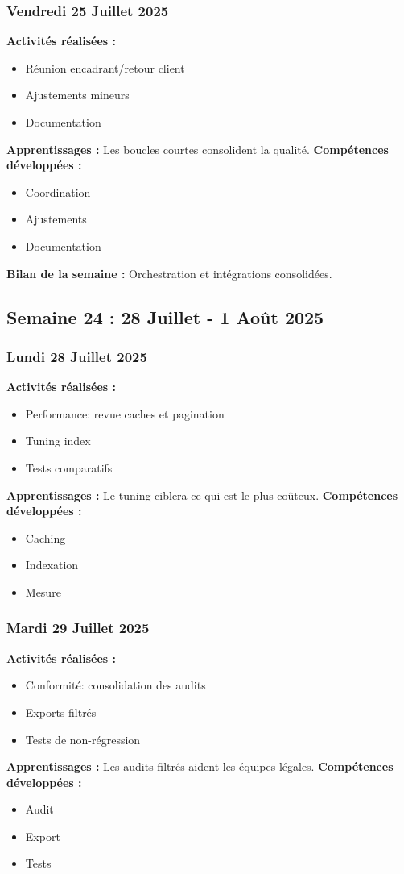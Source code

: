 \documentclass[12pt,a4paper]{article}
\begin{document}
\subsubsection{Vendredi 25 Juillet 2025}
\textbf{Activités réalisées :}
\begin{itemize}
    \item Réunion encadrant/retour client
    \item Ajustements mineurs
    \item Documentation
\end{itemize}
\textbf{Apprentissages :} Les boucles courtes consolident la qualité.
\textbf{Compétences développées :}
\begin{itemize}
    \item Coordination
    \item Ajustements
    \item Documentation
\end{itemize}
\textbf{Bilan de la semaine :} Orchestration et intégrations consolidées.

\clearpage
\subsection{Semaine 24 : 28 Juillet - 1 Août 2025}

\subsubsection{Lundi 28 Juillet 2025}
\textbf{Activités réalisées :}
\begin{itemize}
    \item Performance: revue caches et pagination
    \item Tuning index
    \item Tests comparatifs
\end{itemize}
\textbf{Apprentissages :} Le tuning ciblera ce qui est le plus coûteux.
\textbf{Compétences développées :}
\begin{itemize}
    \item Caching
    \item Indexation
    \item Mesure
\end{itemize}

\subsubsection{Mardi 29 Juillet 2025}
\textbf{Activités réalisées :}
\begin{itemize}
    \item Conformité: consolidation des audits
    \item Exports filtrés
    \item Tests de non-régression
\end{itemize}
\textbf{Apprentissages :} Les audits filtrés aident les équipes légales.
\textbf{Compétences développées :}
\begin{itemize}
    \item Audit
    \item Export
    \item Tests
\end{itemize}
\end{document}
